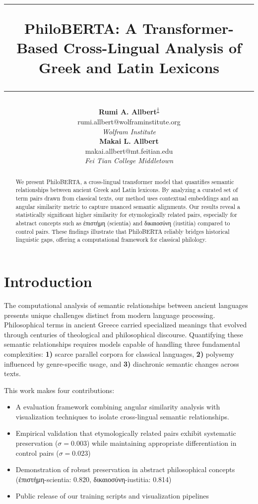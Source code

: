 \documentclass[11pt]{article} %
\title{
    \vspace{-2em}
    {\color{linecolor}\hrule height 0.5pt}
    \vspace{1.5em}
    {\LARGE \textbf{PhiloBERTA: A Transformer-Based Cross-Lingual Analysis of Greek and Latin Lexicons}}
    \vspace{1.5em}
    {\color{linecolor}\hrule height 0.5pt}
    \vspace{1em}
}
\author{
    \begin{minipage}{0.45\textwidth}
        \centering
        {\large \textbf{Rumi A. Allbert}\textsuperscript{\href{https://orcid.org/0009-0008-7963-4087}{†}}}\\[0.2em]
        {\small\ttfamily rumi.allbert@wolframinstitute.org}\\[0.2em]
        {\normalsize \textit{Wolfram Institute}}
    \end{minipage}%
    \hfill
    \begin{minipage}{0.45\textwidth}
        \centering
        {\large \textbf{Makai L. Allbert}}\\[0.2em]
        {\small\ttfamily makai.allbert@mt.feitian.edu}\\[0.2em]
        {\normalsize \textit{Fei Tian College Middletown}}
    \end{minipage}
}
\date{}
\begin{document}
\maketitle

\begin{abstract}
We present PhiloBERTA, a cross-lingual transformer model that quantifies semantic relationships between ancient Greek and Latin lexicons. By analyzing a curated set of term pairs drawn from classical texts, our method uses contextual embeddings and an angular similarity metric to capture nuanced semantic alignments. Our results reveal a statistically significant higher similarity for etymologically related pairs, especially for abstract concepts such as \textgreek{ἐπιστήμη} (scientia) and \textgreek{δικαιοσύνη} (iustitia) compared to control pairs. These findings illustrate that PhiloBERTA reliably bridges historical linguistic gaps, offering a computational framework for classical philology.
\end{abstract}

\section{Introduction}
The computational analysis of semantic relationships between ancient languages presents unique challenges distinct from modern language processing. Philosophical terms in ancient Greece carried specialized meanings that evolved through centuries of theological and philosophical discourse. Quantifying these semantic relationships requires models capable of handling three fundamental complexities: \textbf{1)} scarce parallel corpora for classical languages, \textbf{2)} polysemy influenced by genre-specific usage, and \textbf{3)} diachronic semantic changes across texts.

This work makes four contributions:
\begin{itemize}
\item A evaluation framework combining angular similarity analysis with visualization techniques to isolate cross-lingual semantic relationships.
\item Empirical validation that etymologically related pairs exhibit systematic preservation ($\sigma = 0.003$) while maintaining appropriate differentiation in control pairs ($\sigma = 0.023$)
\item Demonstration of robust preservation in abstract philosophical concepts (\textgreek{ἐπιστήμη}-scientia: 0.820, \textgreek{δικαιοσύνη}-iustitia: 0.814)
\item Public release of our training scripts and visualization pipelines
\end{itemize}
\end{document}
